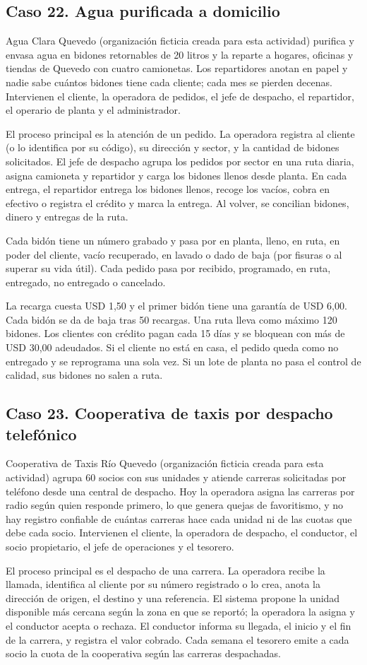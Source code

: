 \documentclass[11pt]{article}
\newcommand{\subseccion}[1]{\subsection{\textcolor{midblue}{#1}}}
\begin{document}
\subseccion{Caso 22. Agua purificada a domicilio}
Agua Clara Quevedo (organización ficticia creada para esta actividad) purifica y envasa agua en bidones retornables de 20 litros y la reparte a hogares, oficinas y tiendas de Quevedo con cuatro camionetas. Los repartidores anotan en papel y nadie sabe cuántos bidones tiene cada cliente; cada mes se pierden decenas. Intervienen el cliente, la operadora de pedidos, el jefe de despacho, el repartidor, el operario de planta y el administrador.

El proceso principal es la atención de un pedido. La operadora registra al cliente (o lo identifica por su código), su dirección y sector, y la cantidad de bidones solicitados. El jefe de despacho agrupa los pedidos por sector en una ruta diaria, asigna camioneta y repartidor y carga los bidones llenos desde planta. En cada entrega, el repartidor entrega los bidones llenos, recoge los vacíos, cobra en efectivo o registra el crédito y marca la entrega. Al volver, se concilian bidones, dinero y entregas de la ruta.

Cada bidón tiene un número grabado y pasa por en planta, lleno, en ruta, en poder del cliente, vacío recuperado, en lavado o dado de baja (por fisuras o al superar su vida útil). Cada pedido pasa por recibido, programado, en ruta, entregado, no entregado o cancelado.

La recarga cuesta USD 1,50 y el primer bidón tiene una garantía de USD 6,00. Cada bidón se da de baja tras 50 recargas. Una ruta lleva como máximo 120 bidones. Los clientes con crédito pagan cada 15 días y se bloquean con más de USD 30,00 adeudados. Si el cliente no está en casa, el pedido queda como no entregado y se reprograma una sola vez. Si un lote de planta no pasa el control de calidad, sus bidones no salen a ruta.

\subseccion{Caso 23. Cooperativa de taxis por despacho telefónico}
Cooperativa de Taxis Río Quevedo (organización ficticia creada para esta actividad) agrupa 60 socios con sus unidades y atiende carreras solicitadas por teléfono desde una central de despacho. Hoy la operadora asigna las carreras por radio según quien responde primero, lo que genera quejas de favoritismo, y no hay registro confiable de cuántas carreras hace cada unidad ni de las cuotas que debe cada socio. Intervienen el cliente, la operadora de despacho, el conductor, el socio propietario, el jefe de operaciones y el tesorero.

El proceso principal es el despacho de una carrera. La operadora recibe la llamada, identifica al cliente por su número registrado o lo crea, anota la dirección de origen, el destino y una referencia. El sistema propone la unidad disponible más cercana según la zona en que se reportó; la operadora la asigna y el conductor acepta o rechaza. El conductor informa su llegada, el inicio y el fin de la carrera, y registra el valor cobrado. Cada semana el tesorero emite a cada socio la cuota de la cooperativa según las carreras despachadas.
\end{document}
